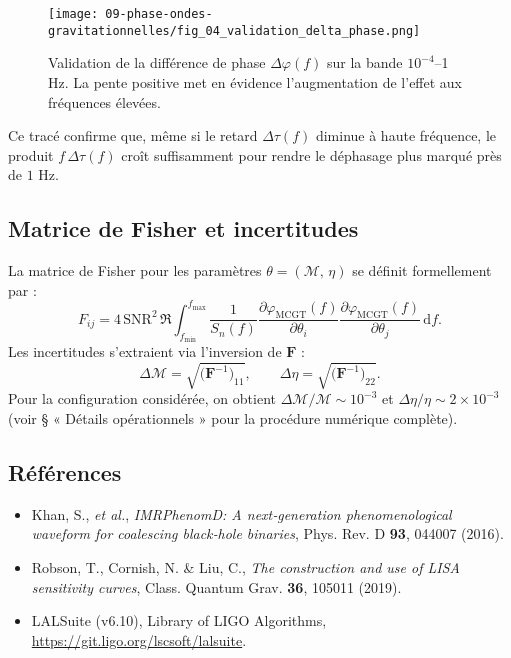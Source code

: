 \begin{figure}[htbp]
  \centering
  \texttt{[image: 09-phase-ondes-gravitationnelles/fig\_04\_validation\_delta\_phase.png]}
  \caption{Validation de la différence de phase \(\Delta\varphi(f)\) sur la bande \(10^{-4}\)–1 Hz. La pente positive met en évidence l’augmentation de l’effet aux fréquences élevées.}
  \label{fig:validation_delta_phase_full}
\end{figure}

Ce tracé confirme que, même si le retard \(\Delta\tau(f)\) diminue à haute fréquence, le produit \(f\,\Delta\tau(f)\) croît suffisamment pour rendre le déphasage plus marqué près de \(1\) Hz.  

\subsection{Matrice de Fisher et incertitudes}
La matrice de Fisher pour les paramètres 
\(\theta = (\mathcal{M},\,\eta)\) se définit formellement par :
\[
  F_{ij}
  = 4\,\mathrm{SNR}^{2}\,
    \Re\!\int_{f_{\min}}^{f_{\max}}
      \frac{1}{S_{n}(f)}
      \frac{\partial\varphi_{\mathrm{MCGT}}(f)}{\partial \theta_{i}}
      \frac{\partial\varphi_{\mathrm{MCGT}}(f)}{\partial \theta_{j}}
    \,\mathrm{d}f.
\]
Les incertitudes s’extraient via l’inversion de \(\mathbf{F}\) :
\[
  \Delta\mathcal{M}
  = \sqrt{\bigl(\mathbf{F}^{-1}\bigr)_{11}},
  \qquad
  \Delta\eta
  = \sqrt{\bigl(\mathbf{F}^{-1}\bigr)_{22}}.
\]
Pour la configuration considérée, on obtient 
\(\Delta\mathcal{M}/\mathcal{M}\sim10^{-3}\) et 
\(\Delta\eta/\eta\sim2\times10^{-3}\) 
(voir § « Détails opérationnels » pour la procédure numérique complète).

\subsection{Références}
\begin{itemize}
  \item Khan, S., \emph{et al.}, \emph{IMRPhenomD: A next‐generation phenomenological waveform for coalescing black‐hole binaries}, Phys. Rev. D \textbf{93}, 044007 (2016).
  \item Robson, T., Cornish, N. \& Liu, C., \emph{The construction and use of LISA sensitivity curves}, Class. Quantum Grav. \textbf{36}, 105011 (2019).
  \item LALSuite (v6.10), Library of LIGO Algorithms, \url{https://git.ligo.org/lscsoft/lalsuite}.
\end{itemize}

